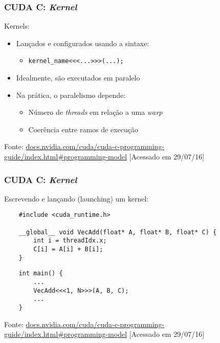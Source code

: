 \documentclass[10pt, compress]{beamer}
\begin{document}
\begin{frame}
    \frametitle{CUDA C: \textit{Kernel}}
    \alert{Kernels}:
    \begin{itemize}
        \item Lançados e configurados usando a sintaxe:
            \begin{itemize}
                \item \texttt{kernel\_name\alert{<<<}...\alert{>>>}(...);}
            \end{itemize}
        \item Idealmente, são executados em \alert{paralelo}
        \item Na prática, o paralelismo depende:
            \begin{itemize}
                \item Número de \textit{threads} em relação a uma \textit{warp}
                \item Coerência entre ramos de execução
            \end{itemize}
    \end{itemize}

    \vfill

    \begin{center}
        \tiny{Fonte: \url{docs.nvidia.com/cuda/cuda-c-programming-guide/index.html\#programming-model} [Acessado em 29/07/16]}
    \end{center}
\end{frame}

\begin{frame}[fragile]
    \frametitle{CUDA C: \textit{Kernel}}
    Escrevendo e \alert{lançando} (launching) um \alert{kernel}:
    \begin{lstlisting}
    #include <cuda_runtime.h>

    __global__ void VecAdd(float* A, float* B, float* C) {
        int i = threadIdx.x;
        C[i] = A[i] + B[i];
    }
    \end{lstlisting}
    \pause
    \begin{lstlisting}
    int main() {
        ...
        VecAdd<<<1, N>>>(A, B, C);
        ...
    }
    \end{lstlisting}
    \vfill

    \begin{center}
        \tiny{Fonte: \url{docs.nvidia.com/cuda/cuda-c-programming-guide/index.html\#programming-model} [Acessado em 29/07/16]}
    \end{center}
\end{frame}
\end{document}
